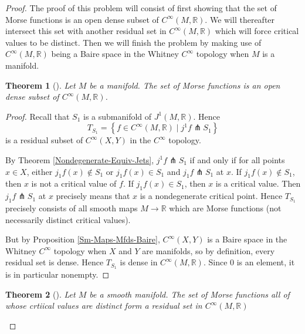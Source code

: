 \documentclass[reqno]{amsart}
\newtheorem{theorem}{Theorem}[section]
\theoremstyle{definition}
\theoremstyle{remark}
\begin{document}
 \begin{proof}
     

 The proof of this problem will
 consist of first showing that
 the set of Morse functions is an open dense
 subset of $C^{\infty}(M,\mathbb{R})$. We will
 thereafter intersect this set with another residual
 set in $C^{\infty}(M,\mathbb{R})$ which will force
 critical values to be distinct. Then
 we will finish the problem by making use of
 $C^{\infty}(M,\mathbb{R})$ being a Baire space in
 the Whitney $C^{\infty}$ topology when
 $M$ is a manifold.



 \begin{theorem}[]\label{Morse-Functions-Open-Dense}
         Let $M$ be a manifold. The set of Morse
         functions is an open dense subset of
         $C^{\infty}(M,\mathbb{R})$.
     \end{theorem}

 \begin{proof}


     Recall that $S_1 $ is a submanifold of
     $J^{1}(M, \mathbb{R})$.
     Hence
     \[
     T_{S_1} = 
     \left\{ f \in C^{\infty}(M,\mathbb{R})
      \mid j^{1}f \pitchfork S_1 \right\} 
     \] 
     is a residual subset of
     $C^{\infty}(X,Y)$ in the $C^{\infty}$ topology.

     By Theorem \ref{Nondegenerate-Equiv-Jets},
     $j^{1}f \pitchfork S_1$ if and only if
     for all points
     $x \in X$, either
     $j_1f (x) \not\in S_1$ or
     $j_1f(x) \in S_1$ and
     $j_1f \pitchfork S_1$ at $x$.
     If $j_1f(x) \not\in S_1$, then
     $x$ is not a critical value of $f$.
     If $j_1f(x) \in S_1$, then
     $x$ is a critical value. Then
     $j_1f \pitchfork S_1$ at $x$ precisely means
     that $x$ is a nondegenerate critical point.
     Hence
     $T_{S_1}$ precisely consists of all
     smooth maps $M \to \mathbb{R}$ which are Morse functions
     (not necessarily distinct critical values).

     But by Proposition \ref{Sm-Maps-Mfds-Baire},
     $C^{\infty}(X,Y)$ is a Baire space in the
     Whitney $C^{\infty}$ topology when
     $X$ and $Y$ are manifolds, so by
     definition, every residual set is dense. Hence
     $T_{S_1}$ is dense in
     $C^{\infty}(M,\mathbb{R})$. Since 
     $0$ is an element, it is in particular nonempty.

 \end{proof}

 \begin{theorem}[]
     Let $M$ be a smooth manifold.
     The set of Morse functions all of whose
     crtiical values are distinct form a residual set
     in $C^{\infty}(M, \mathbb{R})$
 \end{theorem}


\end{proof}
\end{document}
